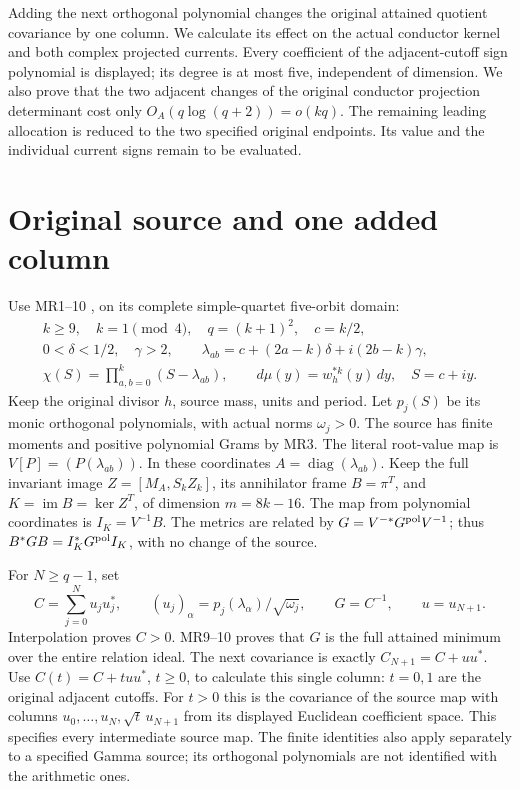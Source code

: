 \documentclass[11pt]{article}
\begin{document}
Adding the next orthogonal polynomial changes the original attained
quotient covariance by one column. We calculate its effect on the actual
conductor kernel and both complex projected currents. Every coefficient
of the adjacent-cutoff sign polynomial is displayed; its degree is at
most five, independent of dimension. We also prove that the two adjacent
changes of the original conductor projection determinant cost only
\(O_A(q\log(q+2))=o(kq)\). The remaining leading allocation is reduced
to the two specified original endpoints. Its value and the individual
current signs remain to be evaluated.

\section{Original source and one added column}
Use MR1--10 \cite{ACCMR}, on its complete simple-quartet five-orbit domain:
\begin{equation}\tag{ACC1}
\begin{gathered}
k\ge9,\quad k=1\pmod4,\quad q=(k+1)^2,\quad c=k/2,\\
0<\delta<1/2,\quad\gamma>2,\qquad
\lambda_{ab}=c+(2a-k)\delta+i(2b-k)\gamma,\\
\chi(S)=\prod_{a,b=0}^k(S-\lambda_{ab}),\qquad
d\mu(y)=w_h^{*k}(y)\,dy,\quad S=c+iy .
\end{gathered}
\end{equation}
Keep the original divisor \(h\), source mass, units and period.
Let \(p_j(S)\) be its monic orthogonal polynomials, with actual norms
\(\omega_j>0\). The source has finite moments and positive polynomial
Grams by MR3. The literal root-value map is \(V[P]=(P(\lambda_{ab}))\).
In these coordinates \(A=\operatorname{diag}(\lambda_{ab})\).
Keep the full invariant image \(Z=[M_A,S_kZ_k]\), its annihilator frame
\(B=\pi^T\), and \(K=\operatorname{im}B=\ker Z^T\), of dimension
\(m=8k-16\). The map from polynomial coordinates is \(I_K=V^{-1}B\).
The metrics are related by \(G=V^{-*}G^{\rm pol}V^{-1}\);
thus \(B^*GB=I_K^*G^{\rm pol}I_K\), with no change of the source.

For \(N\ge q-1\), set
\begin{equation}\tag{ACC2}
C=\sum_{j=0}^N u_ju_j^*,\qquad
(u_j)_\alpha=p_j(\lambda_\alpha)/\sqrt{\omega_j},\qquad
G=C^{-1},\qquad u=u_{N+1}.
\end{equation}
Interpolation proves \(C>0\). MR9--10 proves that \(G\) is the full
attained minimum over the entire relation ideal. The next covariance
is exactly \(C_{N+1}=C+uu^*\).
Use \(C(t)=C+tuu^*\), \(t\ge0\), to calculate this single column:
\(t=0,1\) are the original adjacent cutoffs. For \(t>0\) this is the
covariance of the source map with columns
\(u_0,\ldots,u_N,\sqrt t\,u_{N+1}\) from its displayed Euclidean
coefficient space. This specifies every intermediate source map.
The finite identities also apply separately to a specified Gamma source;
its orthogonal polynomials are not identified with the arithmetic ones.
\end{document}
